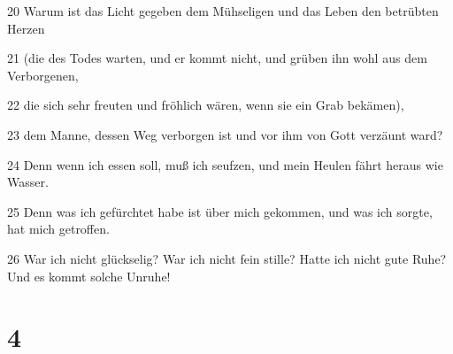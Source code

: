 \par 20 Warum ist das Licht gegeben dem Mühseligen und das Leben den betrübten Herzen
\par 21 (die des Todes warten, und er kommt nicht, und grüben ihn wohl aus dem Verborgenen,
\par 22 die sich sehr freuten und fröhlich wären, wenn sie ein Grab bekämen),
\par 23 dem Manne, dessen Weg verborgen ist und vor ihm von Gott verzäunt ward?
\par 24 Denn wenn ich essen soll, muß ich seufzen, und mein Heulen fährt heraus wie Wasser.
\par 25 Denn was ich gefürchtet habe ist über mich gekommen, und was ich sorgte, hat mich getroffen.
\par 26 War ich nicht glückselig? War ich nicht fein stille? Hatte ich nicht gute Ruhe? Und es kommt solche Unruhe!

\chapter{4}

